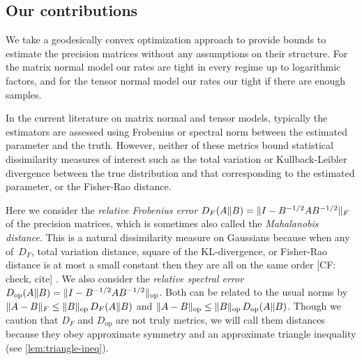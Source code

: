 \documentclass[aos]{imsart}
\theoremstyle{definition}
\numberwithin{equation}{section}
\DeclareMathOperator{\op}{op}
\DeclarePairedDelimiter{\norm}{\lVert}{\rVert}
\newcommand{\CF}[1]{{\color{purple}[CF: #1]}}
\begin{document}
\subsection{Our contributions}
We take a geodesically convex optimization approach to provide bounds to estimate the precision matrices without any assumptions on their structure.
For the matrix normal model our rates are tight in every regime up to logarithmic factors, and for the tensor normal model our rates our tight if there are enough samples.

In the current literature on matrix normal and tensor models, typically the estimators are assessed using Frobenius or spectral norm between the estimated parameter and the truth.
However, neither of these metrics bound statistical dissimilarity measures of interest such as the total variation or Kullback-Leibler divergence between the true distribution and that corresponding to the estimated parameter, or the Fisher-Rao distance.

Here we consider the \emph{relative Frobenius error} $D_F(A \Vert B) = \norm{I - B^{-1/2} A B^{-1/2}}_F$ of the precision matrices, which is sometimes also called the \emph{Mahalanobis distance}.
This is a natural dissimilarity measure on Gaussians because when any of~$D_F$, total variation distance, square of the KL-divergence, or Fisher-Rao distance is at most a small constant then they are all on the same order \CF{check, cite} \citep{barsov1987estimates}.
We also consider the \emph{relative spectral error} $D_{\op}(A \Vert B) = \norm{I - B^{-1/2} A B^{-1/2}}_{\op}$.
Both can be related to the usual norms by $\norm{A - B}_F \leq \norm{B}_{\op} \, D_F(A\Vert B)$ and $\norm{A  - B}_{\op} \leq \norm{B}_{\op} \, D_{\op}(A \Vert B)$.
Though we caution that $D_F$ and $D_{\op}$ are not truly metrics, we will call them distances because they obey approximate symmetry and an approximate triangle inequality (see \cref{lem:triangle-ineq}).
\end{document}

